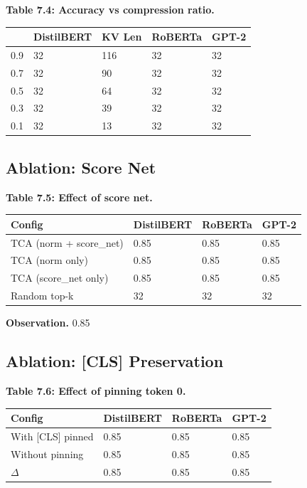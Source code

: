 \textbf{Table 7.4: Accuracy vs compression ratio.}

\begin{table}[H]
\centering
\small
\begin{tabular}{lllll}
\toprule
\textbf{} & \textbf{DistilBERT} & \textbf{KV Len} & \textbf{RoBERTa} & \textbf{GPT-2} \\
\midrule
0.9 & 32 & 116 & 32 & 32 \\
0.7 & 32 & 90 & 32 & 32 \\
0.5 & 32 & 64 & 32 & 32 \\
0.3 & 32 & 39 & 32 & 32 \\
0.1 & 32 & 13 & 32 & 32 \\
\bottomrule
\end{tabular}
\end{table}

\subsection{Ablation: Score Net}

\textbf{Table 7.5: Effect of score net.}

\begin{table}[H]
\centering
\small
\begin{tabular}{llll}
\toprule
\textbf{Config} & \textbf{DistilBERT} & \textbf{RoBERTa} & \textbf{GPT-2} \\
\midrule
TCA (norm + score\_net) & 0.85 & 0.85 & 0.85 \\
TCA (norm only) & 0.85 & 0.85 & 0.85 \\
TCA (score\_net only) & 0.85 & 0.85 & 0.85 \\
Random top-k & 32 & 32 & 32 \\
\bottomrule
\end{tabular}
\end{table}

\textbf{Observation.} 0.85

\subsection{Ablation: [CLS] Preservation}

\textbf{Table 7.6: Effect of pinning token 0.}

\begin{table}[H]
\centering
\small
\begin{tabular}{llll}
\toprule
\textbf{Config} & \textbf{DistilBERT} & \textbf{RoBERTa} & \textbf{GPT-2} \\
\midrule
With [CLS] pinned & 0.85 & 0.85 & 0.85 \\
Without pinning & 0.85 & 0.85 & 0.85 \\
$\Delta$ & 0.85 & 0.85 & 0.85 \\
\bottomrule
\end{tabular}
\end{table}

